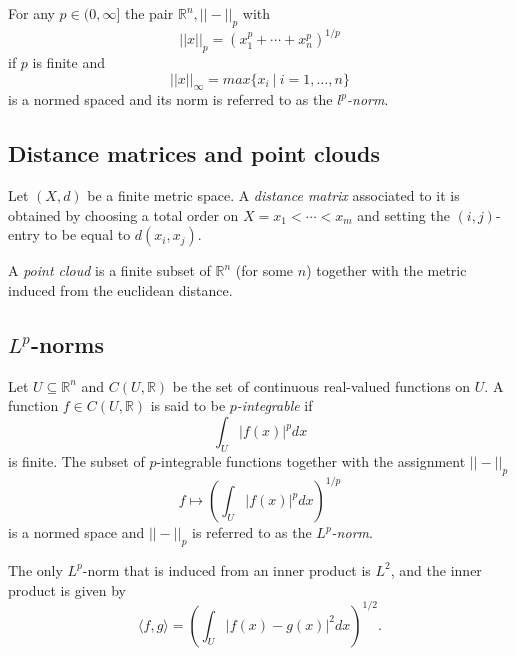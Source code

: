 \documentclass{amsart}
\begin{document}
	For any $p \in (0,\infty]$ the pair $\mathbb R^n, ||-||_p$ with 
	\begin{equation*}
	||x||_p = (x_1^p + \cdots + x_n^p)^{1/p}
	\end{equation*}
	if $p$ is finite and 
	\begin{equation*}
	||x||_{\infty} = max\{x_i\ |\ i = 1,\dots,n\}
	\end{equation*}
	is a normed spaced and its norm is referred to as the $l^p$\textit{-norm}.
	
	\subsection*{Distance matrices and point clouds} \label{distance_matrices_and_point_clouds}
	
	Let $(X, d)$ be a finite
	metric space. A \textit{distance matrix} associated to it is obtained by choosing a total order on $X = {x_1 < \cdots < x_m}$ and setting the $(i,j)$-entry to be equal to $d(x_i, x_j)$.
	
	A \textit{point cloud} is a finite subset of $\mathbb{R}^n$ (for some $n$) together with the metric induced from the
	euclidean distance.
	
	\subsection*{$L^p$-norms} \label{functional_lp}
	
	Let $U \subseteq \mathbb R^n$ and $C(U, \mathbb R)$ be the set of continuous real-valued functions on $U$. A function $f \in C(U, \mathbb R)$ is said to be $p$\textit{-integrable} if
	\begin{equation*}
	\int_U |f(x)|^p dx
	\end{equation*}
	is finite. The subset of $p$-integrable functions together with the assignment $||-||_p$
	\begin{equation*}
	f \mapsto \left( \int_U |f(x)|^p dx \right)^{1/p}
	\end{equation*}
	is a
	normed space and $||-||_p$ is referred to as the $L^p$\textit{-norm}.
	
	The only $L^p$-norm that is induced from an inner product is $L^2$, and the inner product is given by
	\begin{equation*}
	\langle f, g \rangle = \left(\int_U |f(x)-g(x)|^2 dx\right)^{1/2}.
	\end{equation*}
\end{document}
